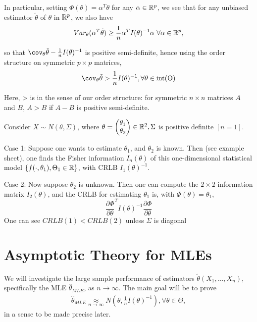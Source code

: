 \documentclass[a4paper]{article}
\begin{document}
In particular, setting $\Phi(\theta) = \alpha ^{T} \theta$ for any $\alpha \in  \mathbb{R}^{p}$, we see that for any unbiased estimator $\tilde{\theta}$ of $\theta$ in $\mathbb{R}^{p}$, we also have
\[
	Var_{\theta} (\alpha ^{T}\tilde{\theta}) \ge \frac{1}{n} \alpha ^{T}I(\theta)^{-1}\alpha \text{     } \forall \alpha \in \mathbb{R}^{p},
\] 

so that $\cov_{\theta} \tilde{\theta} - \frac{1}{n} I(\theta)^{-1}$ is positive semi-definite, hence using the order structure on symmetric $p\times p$ matrices,
\[
	\cov_{\theta} \tilde{\theta} > \frac{1}{n} I(\theta)^{-1}, \forall \theta \in\intr(\Theta)
\] 

\begin{note}
	Here, > is in the sense of our order structure: for symmetric $n\times n$ matrices $A$ and $B$,  $A>B$ if $A-B$ is positive semi-definite.
\end{note}

\begin{eg}
	Consider $X \sim N(\theta, \Sigma)$, where $\theta = \begin{pmatrix} \theta_1 \\ \theta_2 \end{pmatrix} \in \mathbb{R}^{2}, \Sigma$ is positive definite $[n=1] $.

	Case 1: Suppose one wants to estimate $\theta_1$, and  $\theta_2$ is known. Then (see example sheet), one finds the Fisher information $I_{n}(\theta)$ of this one-dimensional statistical model $\{f(\cdot , \theta_1), \Theta_1 \in  \mathbb{R}\} $, with CRLB  $I_1(\theta)^{-1}$.

	Case 2: Now suppose $\theta_2$ is unknown. Then one can compute the $2\times 2$ information matrix $I_2(\theta)$, and the CRLB for estimating $\theta_1$ is, with $\Phi(\theta) = \theta_1$, 
	\[
		\frac{\partial\Phi}{\partial\theta}^{T} I(\theta)^{-1} \frac{\partial\Phi}{\partial\theta}
	\] 
	One can see $CRLB(1) < CRLB(2) $ unless  $\Sigma$ is diagonal
\end{eg}

\section{Asymptotic Theory for MLEs}

We will investigate the large sample performance of estimators $\tilde{\theta}(X_1, \ldots, X_n)$, specifically the MLE $\hat{\theta}_{MLE}$, as $n\to \infty$. The main goal will be to prove
\begin{align*}
	\hat{\theta}_{MLE} \underset{n\to\infty}{\approx} N\left(\theta, \frac{1}{n} I(\theta)^{-1}\right), \forall \theta \in  \Theta
,\end{align*} 
 in a sense to be made precise later.
\end{document}

